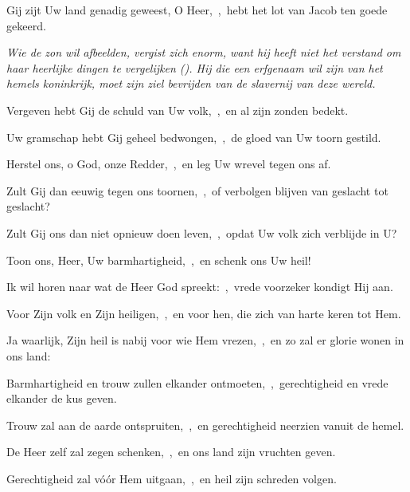 \documentclass[12pt,twoside,a5paper]{article}
\begin{document}




\begin{halfparskip}
  Gij zijt Uw land genadig geweest, O Heer,~\sep\ hebt het lot van Jacob ten goede gekeerd.


   \emph{Wie de zon wil afbeelden, vergist zich enorm, want hij heeft niet het verstand om haar heerlijke dingen te vergelijken (). Hij die een erfgenaam wil zijn van het hemels koninkrijk, moet zijn ziel bevrijden van de slavernij van deze wereld.}

  Vergeven hebt Gij de schuld van Uw volk,~\sep\ en al zijn zonden bedekt.

  Uw gramschap hebt Gij geheel bedwongen,~\sep\ de gloed van Uw toorn gestild.
\end{halfparskip}


\begin{halfparskip}
  Herstel ons, o God, onze Redder,~\sep\ en leg Uw wrevel tegen ons af.

  Zult Gij dan eeuwig tegen ons toornen,~\sep\ of verbolgen blijven van geslacht tot geslacht?

  Zult Gij ons dan niet opnieuw doen leven,~\sep\ opdat Uw volk zich verblijde in U?

  Toon ons, Heer, Uw barmhartigheid,~\sep\ en schenk ons Uw heil!
\end{halfparskip}


\begin{halfparskip}
  Ik wil horen naar wat de Heer God spreekt:~\sep\ vrede voorzeker kondigt Hij aan.

  Voor Zijn volk en Zijn heiligen,~\sep\ en voor hen, die zich van harte keren tot Hem.

  Ja waarlijk, Zijn heil is nabij voor wie Hem vrezen,~\sep\ en zo zal er glorie wonen in ons land:

  Barmhartigheid en trouw zullen elkander ontmoeten,~\sep\ gerechtigheid en vrede elkander de kus  geven.

  Trouw zal aan de aarde ontspruiten,~\sep\ en gerechtigheid neerzien vanuit de hemel.

  De Heer zelf zal zegen schenken,~\sep\ en ons land zijn vruchten geven.

  Gerechtigheid zal vóór Hem uitgaan,~\sep\ en heil zijn schreden volgen.
\end{halfparskip}
\end{document}
